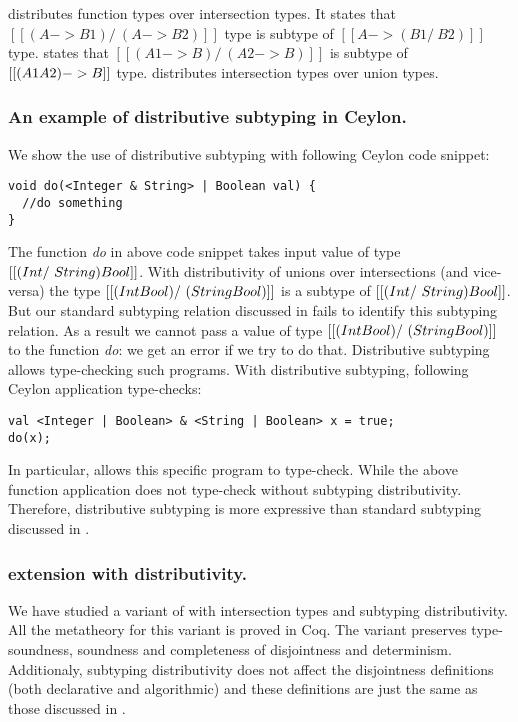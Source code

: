  distributes function types over intersection types.
It states that $[[(A -> B1) /\ (A -> B2)]]$ type is subtype of
$[[A -> (B1 /\ B2)]]$ type.
 states that $[[(A1 -> B) /\ (A2 -> B)]]$ is subtype of
$[[(A1 \/ A2) -> B]]$ type.
 distributes intersection types over union types.

\subsubsection*{An example of distributive subtyping in Ceylon.}
We show the use of distributive subtyping with following Ceylon code snippet:

\begin{lstlisting}
void do(<Integer & String> | Boolean val) {
  //do something
}
\end{lstlisting}

\noindent The function \emph{do} in above code snippet takes input value of type 
$[[(Int /\ String) \/ Bool]]$. With distributivity of unions over intersections
(and vice-versa) the type $[[(Int \/ Bool) /\ (String \/ Bool)]]$ is a
subtype of $[[(Int /\ String) \/ Bool]]$.
But our standard subtyping relation discussed in 
fails to identify this subtyping relation.
As a result we cannot pass a
value of type $[[(Int \/ Bool) /\ (String \/ Bool)]]$ to the function
\emph{do}: we get an error if we try to do that.
Distributive subtyping allows type-checking such programs.
With distributive subtyping, following Ceylon application type-checks:

\begin{lstlisting}
val <Integer | Boolean> & <String | Boolean> x = true;
do(x);
\end{lstlisting}

\noindent In particular,  allows this specific program to type-check.
While the above function application does not type-check without
subtyping distributivity.
Therefore, distributive subtyping is more expressive than standard subtyping
discussed in .


\subsubsection*{\name extension with distributivity.}
We have studied a variant of \name with intersection types and subtyping distributivity.
All the metatheory for this variant is proved in Coq. The variant preserves
type-soundness, soundness and completeness of disjointness and determinism.
Additionaly, subtyping distributivity
does not affect the disjointness definitions (both declarative and algorithmic)
and these definitions are just the same as those discussed in .

